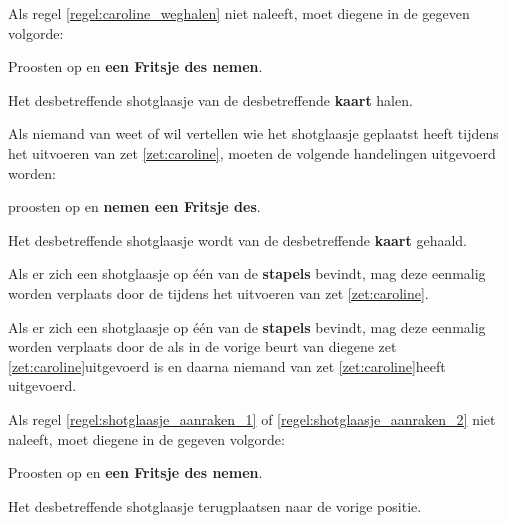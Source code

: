 \vervolgLijst{}
\item Als \eenSpeler regel \ref{regel:caroline_weghalen} niet naleeft, moet diegene in de gegeven volgorde:
\puntLijst{}
\item Proosten op  en \textbf{een Fritsje des nemen}\footnotemark[2].
\item Het desbetreffende shotglaasje van de desbetreffende \textbf{kaart} halen.
\eindPuntLijst{}
\eindLijst{}

\vervolgLijst{}
\item Als niemand van \alleSpelers weet of wil vertellen wie het shotglaasje geplaatst heeft tijdens het uitvoeren van zet \ref{zet:caroline}\footnotemark[1], moeten de volgende handelingen uitgevoerd worden:
\puntLijst{}
\item \AlleSpelers proosten op  en \textbf{nemen een Fritsje des}\footnotemark[2].
\item Het desbetreffende shotglaasje wordt van de desbetreffende \textbf{kaart} gehaald.
\eindPuntLijst{}
\eindLijst{}


\vervolgLijst{}
\item \label{regel:shotglaasje_aanraken_1} Als er zich een shotglaasje op \'e\'en van de \textbf{stapels} bevindt, mag deze eenmalig worden verplaats door de \huidigeSpeler tijdens het uitvoeren van zet \ref{zet:caroline}\footnotemark[1].
\eindLijst{}

\vervolgLijst{}
\item \label{regel:shotglaasje_aanraken_2} Als er zich een shotglaasje op \'e\'en van de \textbf{stapels} bevindt, mag deze eenmalig worden verplaats door de \huidigeSpeler als in de vorige beurt van diegene zet \ref{zet:caroline}\footnotemark[1] uitgevoerd is en daarna niemand van \alleSpelers zet \ref{zet:caroline}\footnotemark[3] heeft uitgevoerd.
\eindLijst{}

\vervolgLijst{}
\item Als \eenSpeler regel \ref{regel:shotglaasje_aanraken_1} of \ref{regel:shotglaasje_aanraken_2} niet naleeft, moet diegene in de gegeven volgorde:
\puntLijst{}
\item Proosten op  en \textbf{een Fritsje des nemen}\footnotemark[2].
\item Het desbetreffende shotglaasje terugplaatsen naar de vorige positie.
\eindPuntLijst{}
\eindLijst{}


